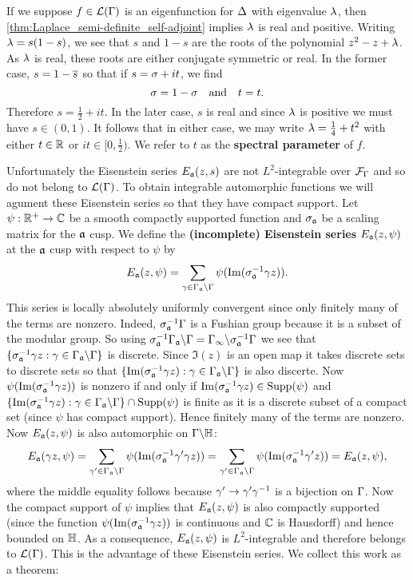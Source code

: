       If we suppose $f \in \mathcal{L}(\Gamma)$ is an eigenfunction for $\Delta$ with eigenvalue $\lambda$, then \cref{thm:Laplace_semi-definite_self-adjoint} implies $\lambda$ is real and positive. Writing $\lambda = s(1-s)$, we see that $s$ and $1-s$ are the roots of the polynomial $z^{2}-z+\lambda$. As $\lambda$ is real, these roots are either conjugate symmetric or real. In the former case, $s = 1-\overline{s}$ so that if $s = \sigma+it$, we find
      \[
        \sigma = 1-\sigma \quad \text{and} \quad t = t.
      \]
      Therefore $s = \frac{1}{2}+it$. In the later case, $s$ is real and since $\lambda$ is positive we must have $s \in (0,1)$. It follows that in either case, we may write $\lambda = \frac{1}{4}+t^{2}$ with either $t \in \mathbb{R}$ or $it \in [0,\frac{1}{2})$. We refer to $t$ as the \textbf{spectral parameter} of $f$.

      Unfortunately the Eisenstein series $E_{\mathfrak{a}}(z,s)$ are not $L^{2}$-integrable over $\mathcal{F}_{\Gamma}$ and so do not belong to $\mathcal{L}(\Gamma)$. To obtain integrable automorphic functions we will agument these Eisenstein series so that they have compact support. Let $\psi:\mathbb{R}^{+} \to \mathbb{C}$ be a smooth compactly supported function and $\sigma_{\mathfrak{a}}$ be a scaling matrix for the $\mathfrak{a}$ cusp. We define the \textbf{(incomplete) Eisenstein series} $E_{\mathfrak{a}}(z,\psi)$ at the $\mathfrak{a}$ cusp with respect to $\psi$ by
      \[
        E_{\mathfrak{a}}(z,\psi) = \sum_{\gamma \in \Gamma_{\mathfrak{a}}\backslash\Gamma}\psi(\mathrm{Im}(\sigma_{\mathfrak{a}}^{-1}\gamma z)).
      \]
      This series is locally absolutely uniformly convergent since only finitely many of the terms are nonzero. Indeed, $\sigma_{\mathfrak{a}}^{-1}\Gamma$ is a Fushian group because it is a subset of the modular group. So using $\sigma_{\mathfrak{a}}^{-1}\Gamma_{\mathfrak{a}}\backslash\Gamma = \Gamma_{\infty}\backslash\sigma_{\mathfrak{a}}^{-1}\Gamma$ we see that $\{\sigma_{\mathfrak{a}}^{-1}\gamma z:\gamma \in \Gamma_{\mathfrak{a}}\backslash\Gamma\}$ is discrete. Since $\Im(z)$ is an open map it takes discrete sets to discrete sets so that $\{\mathrm{Im}(\sigma_{\mathfrak{a}}^{-1}\gamma z):\gamma \in \Gamma_{\mathfrak{a}}\backslash\Gamma\}$ is also discerte. Now $\psi(\mathrm{Im}(\sigma_{\mathfrak{a}}^{-1}\gamma z))$ is nonzero if and only if $\mathrm{Im}(\sigma_{\mathfrak{a}}^{-1}\gamma z) \in \mathrm{Supp}(\psi)$ and $\{\mathrm{Im}(\sigma_{\mathfrak{a}}^{-1}\gamma z):\gamma \in \Gamma_{\mathfrak{a}}\backslash\Gamma\} \cap \mathrm{Supp}(\psi)$ is finite as it is a discrete subset of a compact set (since $\psi$ has compact support). Hence finitely many of the terms are nonzero. Now $E_{\mathfrak{a}}(z,\psi)$ is also automorphic on $\Gamma\backslash\mathbb{H}$:
      \[
        E_{\mathfrak{a}}(\gamma z,\psi) = \sum_{\gamma' \in \Gamma_{\mathfrak{a}}\backslash\Gamma}\psi(\mathrm{Im}(\sigma_{\mathfrak{a}}^{-1}\gamma'\gamma z)) = \sum_{\gamma' \in \Gamma_{\mathfrak{a}}\backslash\Gamma}\psi(\mathrm{Im}(\sigma_{\mathfrak{a}}^{-1}\gamma' z)) = E_{\mathfrak{a}}(z,\psi),
      \]
      where the middle equality follows because $\gamma' \to \gamma'\gamma^{-1}$ is a bijection on $\Gamma$. Now the compact support of $\psi$ implies that $E_{\mathfrak{a}}(z,\psi)$ is also compactly supported (since the function $\psi(\mathrm{Im}(\sigma_{\mathfrak{a}}^{-1}\gamma z))$ is continuous and $\mathbb{C}$ is Hausdorff) and hence bounded on $\mathbb{H}$. As a consequence, $E_{\mathfrak{a}}(z,\psi)$ is $L^{2}$-integrable and therefore belongs to $\mathcal{L}(\Gamma)$. This is the advantage of these Eisenstein series. We collect this work as a theorem:

